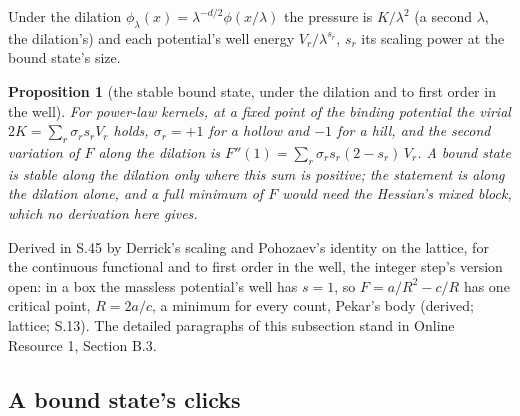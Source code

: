 \documentclass[pdflatex,sn-mathphys-num]{sn-jnl}
\theoremstyle{thmstyleone}
\newtheorem{proposition}{Proposition}
\theoremstyle{thmstyletwo}
\begin{document}
Under the dilation $\phi_\lambda(x) = \lambda^{-d / 2}\phi(x / \lambda)$ the pressure is $K / \lambda^2$ (a second $\lambda$, the dilation's) and each potential's well energy $V_r / \lambda^{s_r}$, $s_r$ its scaling power at the bound state's size.

\begin{proposition}[the stable bound state, under the dilation and to first order in the well]\label{th:stable}
For power-law kernels, at a fixed point of the binding potential the virial $2K = \sum_r \sigma_r s_r V_r$ holds, $\sigma_r = +1$ for a hollow and $-1$ for a hill, and the second variation of $F$ along the dilation is $F''(1) = \sum_r \sigma_r s_r (2 - s_r)\,V_r$. A bound state is stable along the dilation only where this sum is positive; the statement is along the dilation alone, and a full minimum of $F$ would need the Hessian's mixed block, which no derivation here gives.
\end{proposition}

Derived in S.45 by Derrick's scaling \cite{derrick} and Pohozaev's identity \cite{pohozaev} on the lattice, for the continuous functional and to first order in the well, the integer step's version open: in a box the massless potential's well has $s = 1$, so $F = a / R^2 - c / R$ has one critical point, $R = 2a / c$, a minimum for every count, Pekar's body \cite{pekar} (derived; lattice; S.13). The detailed paragraphs of this subsection stand in Online Resource 1, Section B.3.

\subsection{A bound state's clicks}\label{sec:bodyclicks}
\end{document}
